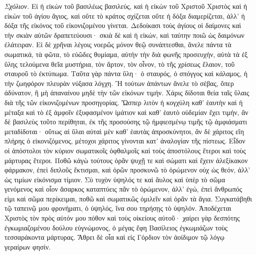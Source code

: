 \documentclass[10pt]{book}
\newcommand{\switchgreek}[1][]{\selectlanguage{polutonikogreek} \switchcolumn*[#1]}
\newcommand{\switchenglish}{\selectlanguage{english} \switchcolumn}
\begin{document}
\begin{paracol}{2}
\switchgreek

\emph{Σχόλιον.} Εἰ ἡ εἰκὼν τοῦ βασιλέως βασιλεύς,
καὶ ἡ εἰκὼν τοῦ Χριστοῦ Χριστὸς
καὶ ἡ εἰκὼν τοῦ ἁγίου ἅγιος,
καὶ οὔτε τὸ κράτος σχίζεται οὔτε ἡ δόξα διαμερίζεται, ἀλλ’ ἡ
δόξα τῆς εἰκόνος τοῦ εἰκονιζομένου γίνεται. Δεδοίκασι τοὺς ἁγίους οἱ δαίμονες
καὶ τὴν σκιὰν αὐτῶν δραπετεύουσι· σκιὰ δὲ καὶ ἡ εἰκών, καὶ ταύτην ποιῶ ὡς
δαιμόνων ἐλάτειραν. Εἰ δὲ χρῆναι λέγοις νοερῶς μόνον θεῷ συνάπτεσθαι, ἄνελε
πάντα τὰ σωματικά, τὰ φῶτα, τὸ εὐῶδες θυμίαμα, αὐτὴν τὴν διὰ φωνῆς προσευχήν,
αὐτὰ τὰ ἐξ ὕλης τελούμενα θεῖα μυστήρια, τὸν ἄρτον, τὸν οἶνον, τὸ τῆς χρίσεως
ἔλαιον, τοῦ σταυροῦ τὸ ἐκτύπωμα. Ταῦτα γὰρ πάντα ὕλη· ὁ σταυρός, ὁ σπόγγος καὶ
κάλαμος, ἡ τὴν ζωηφόρον πλευρὰν νύξασα λόγχη. Ἢ τούτων ἁπάντων ἄνελε τὸ σέβας,
ὅπερ ἀδύνατον, ἢ μὴ ἀπαναίνου μηδὲ τὴν τῶν εἰκόνων τιμήν. Χάρις δίδοται θεία
ταῖς ὕλαις διὰ τῆς τῶν εἰκονιζομένων προσηγορίας. Ὥσπερ λιτὸν ἡ κογχύλη καθ’
ἑαυτὴν καὶ ἡ μέταξα καὶ τὸ ἐξ ἀμφοῖν ἐξυφασμένον ἱμάτιον καὶ καθ’ ἑαυτὸ
οὐδεμίαν ἔχει τιμήν, ἂν δὲ βασιλεὺς τοῦτο περίθηται, ἐκ τῆς προσούσης τῷ
ἠμφιεσμένῳ τιμῆς τῷ ἀμφιάσματι μεταδίδοται· οὕτως αἱ ὕλαι αὐταὶ μὲν καθ’
ἑαυτὰς ἀπροσκύνητοι, ἂν δὲ χάριτος εἴη πλήρης ὁ εἰκονιζόμενος, μέτοχοι χάριτος
γίνονται κατ’ ἀναλογίαν τῆς πίστεως. Εἶδον οἱ ἀπόστολοι τὸν κύριον σωματικοῖς
ὀφθαλμοῖς καὶ τοὺς ἀποστόλους ἕτεροι καὶ τοὺς μάρτυρας ἕτεροι. Ποθῶ κἀγὼ
τούτους ὁρᾶν ψυχῇ τε καὶ σώματι καὶ ἔχειν ἀλεξίκακον φάρμακον, ἐπεὶ διπλοῦς
ἔκτισμαι, καὶ ὁρῶν προσκυνῶ τὸ ὁρώμενον οὐχ ὡς θεόν, ἀλλ’ ὡς τιμίων εἰκόνισμα
τίμιον. Σὺ τυχὸν ὑψηλός τε καὶ ἄυλος καὶ ὑπὲρ τὸ σῶμα γενόμενος καὶ οἷον
ἄσαρκος καταπτύεις πᾶν τὸ ὁρώμενον, ἀλλ’ ἐγώ, ἐπεὶ ἄνθρωπός εἰμι καὶ σῶμα
περίκειμαι, ποθῶ καὶ σωματικῶς ὁμιλεῖν καὶ ὁρᾶν τὰ ἅγια. Συγκατάβηθι τῷ
ταπεινῷ μου φρονήματι, ὁ ὑψηλός, ἵνα σου τηρήσῃς τὸ ὑψηλόν. Ἀποδέχεται Χριστὸς
τὸν πρὸς αὐτόν μου πόθον καὶ τοὺς οἰκείους αὐτοῦ· χαίρει γὰρ δεσπότης
ἐγκωμιαζομένου δούλου εὐγνώμονος, ὁ μέγας ἔφη Βασίλειος ἐγκωμιάζων τοὺς
τεσσαράκοντα μάρτυρας. Ἄθρει δὲ οἷα καὶ εἰς Γόρδιον τὸν ἀοίδιμον τῷ λόγῳ
γεραίρων φησίν.

\switchenglish


\end{paracol}
\end{document}
